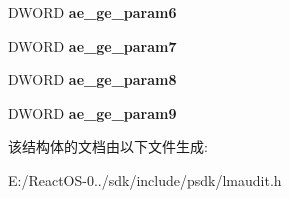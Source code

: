 \begin{DoxyCompactItemize}
\item 
\mbox{\label{struct___a_e___g_e_n_e_r_i_c_a92731511ea776151be2893ca11bc4e0a}} 
D\+W\+O\+RD {\bfseries ae\+\_\+ge\+\_\+param6}
\item 
\mbox{\label{struct___a_e___g_e_n_e_r_i_c_ab23e92e0f19c7adec30069174655806f}} 
D\+W\+O\+RD {\bfseries ae\+\_\+ge\+\_\+param7}
\item 
\mbox{\label{struct___a_e___g_e_n_e_r_i_c_a179fcbc7e3b53f9ea9fc4c9ade4e797b}} 
D\+W\+O\+RD {\bfseries ae\+\_\+ge\+\_\+param8}
\item 
\mbox{\label{struct___a_e___g_e_n_e_r_i_c_a7f979ae6820be8b36b1b62de8a0273ff}} 
D\+W\+O\+RD {\bfseries ae\+\_\+ge\+\_\+param9}
\end{DoxyCompactItemize}


该结构体的文档由以下文件生成\+:\begin{DoxyCompactItemize}
\item 
E\+:/\+React\+O\+S-\/0../sdk/include/psdk/lmaudit.\+h\end{DoxyCompactItemize}
